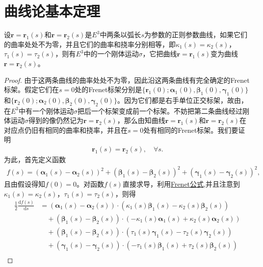 \documentclass[../../main.tex]{subfiles}%
\begin{document}
\section{曲线论基本定理}

\begin{theorem}\label{theorem:两条曲率挠率相同的曲线只相差一个位置}
设$\bm{r} = \bm{r}_1(s)$和$\bm{r} = \bm{r}_2(s)$是$E^3$中两条以弧长$s$为参数的正则参数曲线，如果它们的曲率处处不为零，并且它们的曲率和挠率分别相等，即$\kappa_1(s) = \kappa_2(s)$，$\tau_1(s) = \tau_2(s)$，则有$E^3$中的一个刚体运动$\sigma$，它把曲线$\bm{r} = \bm{r}_1(s)$变为曲线$\bm{r} = \bm{r}_2(s)$。
\end{theorem}
\begin{proof}
由于这两条曲线的曲率处处不为零，因此沿这两条曲线有完全确定的Frenet标架。假定它们在$s=0$处的Frenet标架分别是$\{\bm{r}_1(0);\bm{\alpha}_1(0),\bm{\beta}_1(0),\bm{\gamma}_1(0)\}$和$\{\bm{r}_2(0);\bm{\alpha}_2(0),\bm{\beta}_2(0),\bm{\gamma}_2(0)\}$。因为它们都是右手单位正交标架，故由，在$E^3$中有一个刚体运动$\sigma$把后一个标架变成前一个标架。不妨把第二条曲线经过刚体运动$\sigma$得到的像仍然记为$\bm{r} = \bm{r}_2(s)$，那么由知曲线$\bm{r} = \bm{r}_1(s)$和$\bm{r} = \bm{r}_2(s)$在对应点仍旧有相同的曲率和挠率，并且在$s=0$处有相同的Frenet标架。我们要证明
\begin{align*}
\bm{r}_1(s) = \bm{r}_2(s),\quad \forall s.
\end{align*}
为此，首先定义函数
\begin{align}
f(s) = (\bm{\alpha}_1(s) - \bm{\alpha}_2(s))^2 + (\bm{\beta}_1(s) - \bm{\beta}_2(s))^2 + (\bm{\gamma}_1(s) - \bm{\gamma}_2(s))^2,
\label{eq:--3ur0jfdjgijiL:LIHFIOAWHFNASawf5.1}
\end{align}
且由假设得知$f(0) = 0$。对函数$f(s)$直接求导，利用\hyperref[theorem:微分几何-Frenet公式]{Frenet公式},并且注意到$\kappa_1(s) = \kappa_2(s)$，$\tau_1(s) = \tau_2(s)$，则得
\begin{align*}
\frac{1}{2}\frac{\mathrm{d}f(s)}{\mathrm{d}s} &= (\bm{\alpha}_1(s) - \bm{\alpha}_2(s)) \cdot (\kappa_1(s)\bm{\beta}_1(s) - \kappa_2(s)\bm{\beta}_2(s)) \\
&\quad + (\bm{\beta}_1(s) - \bm{\beta}_2(s)) \cdot (-\kappa_1(s)\bm{\alpha}_1(s) + \kappa_2(s)\bm{\alpha}_2(s)) \\
&\quad + (\bm{\beta}_1(s) - \bm{\beta}_2(s)) \cdot (\tau_1(s)\bm{\gamma}_1(s) - \tau_2(s)\bm{\gamma}_2(s)) \\
&\quad + (\bm{\gamma}_1(s) - \bm{\gamma}_2(s)) \cdot (-\tau_1(s)\bm{\beta}_1(s) + \tau_2(s)\bm{\beta}_2(s)) \\

\end{align*}
\end{proof}
\end{document}
